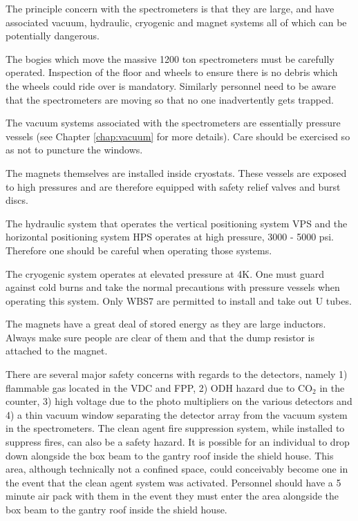 The principle concern with the spectrometers is that they are large, 
and have associated vacuum, hydraulic, cryogenic and magnet systems all of 
which can be potentially dangerous.

The bogies which move the massive 1200 ton spectrometers must be 
carefully operated.  Inspection of the floor and wheels to ensure there is no 
debris which the wheels could ride over is mandatory.  Similarly 
personnel need to be aware that the spectrometers are moving so that no one 
inadvertently gets trapped.

The vacuum systems associated with the spectrometers are essentially 
pressure vessels (see Chapter \ref{chap:vacuum} for more details).
Care should be exercised so as not to puncture the 
windows.

The magnets themselves are installed inside cryostats.  These vessels 
are exposed to high pressures and are therefore equipped with safety 
relief valves and burst discs.

The hydraulic system that operates the vertical positioning system VPS 
and the horizontal positioning system HPS operates at high pressure, 
3000 - 5000 psi.  Therefore one should be careful when operating those 
systems.

The cryogenic system operates at elevated pressure at 4K.  One must 
guard against cold burns and take the normal precautions with pressure 
vessels when operating this system.  Only WBS7 are permitted to install 
and take out U tubes.

The magnets have a great deal of stored energy as they are large 
inductors. Always make sure people are clear of them and that
the dump resistor is attached to the magnet.

There are several major safety concerns with regards to the detectors, 
namely 1) flammable gas located in the VDC and FPP, 2) ODH hazard due to 
CO$_2$ in the \Cherenkov{} counter, 3) high voltage due to the photo 
multipliers on the various detectors and 4) a thin vacuum window 
separating the detector array from the vacuum system in the 
spectrometers.  The clean agent fire suppression system, while installed 
to suppress fires, can also be a safety hazard.  It is possible for an 
individual to drop down alongside the box beam to the gantry roof 
inside the shield house.  This area, although technically not a confined 
space, could conceivably become one in the event that the clean agent 
system was activated.  Personnel should have a 5 minute air pack with 
them in the event they must enter the area alongside the box beam to the gantry roof 
inside the shield house.

